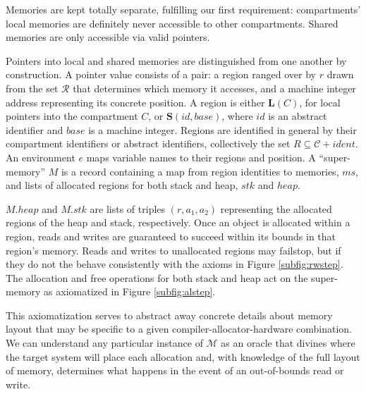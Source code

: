 \documentclass{article}
\begin{document}
Memories are kept totally separate, fulfilling our first requirement:
compartments' local memories are definitely never accessible to other compartments.
Shared memories are only accessible via valid pointers.

Pointers into local and shared memories are distinguished from one another by construction.
A pointer value consists of a pair: a region ranged over by \(r\) drawn from the set
\(\mathcal{R}\) that determines which memory it accesses, and a machine integer address representing
its concrete position. A region is either \(\mathbf{L}(C)\), for local pointers into
the compartment \(C\), or \(\mathbf{S}(id,\mathit{base})\), where \(id\) is an
abstract identifier and \(\mathit{base}\) is a machine integer. Regions are identified
in general by their compartment identifiers or abstract identifiers, collectively
the set \(R \subseteq \mathcal{C} + \mathit{ident}\). An environment \(e\) maps variable names to
their regions and position. A ``super-memory'' \(M\)
is a record containing a map from region identities to memories, \(ms\),
and lists of allocated regions for both stack and heap, \(stk\) and \(heap\).

\(M.heap\) and \(M.stk\) are lists of triples \((r, a_1, a_2)\) representing
the allocated regions of the heap and stack, respectively.
Once an object is allocated within a region, reads and writes are guaranteed to succeed
within its bounds in that region's memory. Reads and writes to unallocated regions may
failstop, but if they do not the behave consistently with the axioms in Figure \ref{subfig:rwstep}.
The allocation and free operations for both stack and heap act on the super-memory
as axiomatized in Figure \ref{subfig:alstep}.

This axiomatization serves to abstract away concrete details about memory layout
that may be specific to a given compiler-allocator-hardware combination. We can
understand any particular instance of \(\mathcal{M}\) as an oracle that divines where
the target system will place each allocation and, with knowledge of the full layout of
memory, determines what happens in the event of an out-of-bounds read or write.
\end{document}
